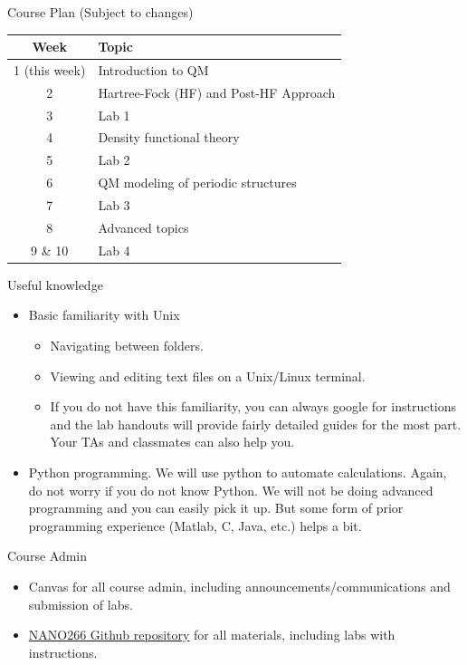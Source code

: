 \documentclass[aspectratio=169]{beamer}
\begin{document}
\begin{frame}{Course Plan (Subject to changes)}
\begin{table}[]
    \centering
    \begin{tabular}{c| l}
        \textbf{Week} & \textbf{Topic}\\
        \hline
        1 (this week) & Introduction to QM \\
        2 & Hartree-Fock (HF) and Post-HF Approach\\
        3 & Lab 1 \\
        4 & Density functional theory\\
        5 & Lab 2\\
        6 & QM modeling of periodic structures\\
        7 & Lab 3\\
        8 & Advanced topics\\
        9 \& 10 & Lab 4
    \end{tabular}
\end{table}

\end{frame}


\begin{frame}{Useful knowledge}
    \begin{itemize}
        \item Basic familiarity with Unix
        \begin{itemize}
            \item Navigating between folders.
            \item Viewing and editing text files on a Unix/Linux terminal.
            \item If you do not have this familiarity, you can always google for instructions and the lab handouts will provide fairly detailed guides for the most part. Your TAs and classmates can also help you.
        \end{itemize}
        \item Python programming. We will use python to automate calculations. Again, do not worry if you do not know Python. We will not be doing advanced programming and you can easily pick it up. But some form of prior programming experience (Matlab, C, Java, etc.) helps a bit.
    \end{itemize}
\end{frame}


\begin{frame}{Course Admin}
    \begin{itemize}
        \item Canvas for all course admin, including announcements/communications and submission of labs.
        \item \href{https://materialsvirtuallab.github.io/nano266/}{NANO266 Github repository} for all materials, including labs with instructions.
    \end{itemize}
\end{frame}
\end{document}

